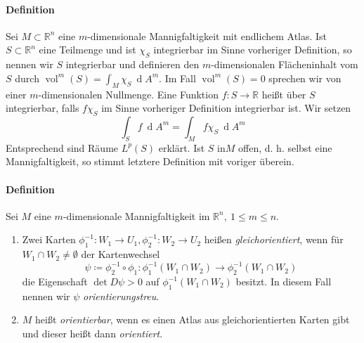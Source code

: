 \documentclass[12pt,a4paper,fleqn]{article}
\def\R{{\mathbb{R}}}
\def\d{{\operatorname{d}}}
\begin{document}
 \paragraph{Definition} Sei $M \subset \R^n$ eine $m$-dimensionale Mannigfaltigkeit mit endlichem Atlas. Ist $S \subset \R^n$ eine Teilmenge und ist $\chi_S$ integrierbar im Sinne vorheriger Definition, so nennen wir $S$ integrierbar und definieren den $m$-dimensionalen Flächeninhalt vom $S$ durch $\operatorname{vol}^m(S) = \int_M \chi_S\ \d A^m$. Im Fall $\operatorname{vol}^m(S) = 0$ sprechen wir von einer $m$-dimensionalen Nullmenge. Eine Funktion $f\colon S \rightarrow \R$ heißt über $S$ integrierbar, falls $f\chi_S$ im Sinne vorheriger Definition integrierbar ist. Wir setzen 
\begin{displaymath}
\int_S f\ \d A^m = \int_M f\chi_S\ \d A^m
\end{displaymath}
Entsprechend sind Räume $L^p(S)$ erklärt. Ist $S$ in$M$ offen, d. h. selbst eine Mannigfaltigkeit, so stimmt letztere Definition mit voriger überein.

\paragraph{Definition} Sei $M$ eine $m$-dimensionale Mannigfaltigkeit im $\R^n,\ 1\leq m\leq n$.
\begin{enumerate}
\item Zwei Karten $\phi^{-1}_1\colon W_1 \rightarrow U_1, \phi^{-1}_2\colon W_2 \rightarrow U_2$ heißen \textit{gleichorientiert}, wenn für $W_1 \cap W_2 \neq \emptyset$ der Kartenwechsel 
\begin{displaymath}
\psi \coloneqq \phi_2^{-1} \circ \phi_1 \colon \phi_1^{-1}(W_1\cap W_2) \rightarrow \phi_2^{-1}(W_1\cap W_2)
\end{displaymath}
die Eigenschaft $\det D\psi > 0$ auf $\phi_1^{-1}(W_1 \cap W_2)$ besitzt. In diesem Fall nennen wir $\psi$ \textit{orientierungstreu}.
\item $M$ heißt \textit{orientierbar}, wenn es einen Atlas aus gleichorientierten Karten gibt und dieser heißt dann \textit{orientiert}.
\end{enumerate}
\end{document}
